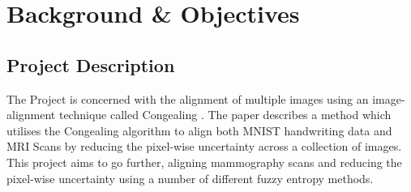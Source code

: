 \chapter{Background \& Objectives}

\section{Project Description}
The Project is concerned with the alignment of multiple images using an image-alignment technique called Congealing \cite{joint-alignment}. The paper describes a method which utilises the Congealing algorithm to align both MNIST handwriting data and MRI Scans by reducing the pixel-wise uncertainty across a collection of images. This project aims to go further, aligning mammography scans and reducing the pixel-wise uncertainty using a number of different fuzzy entropy methods.
